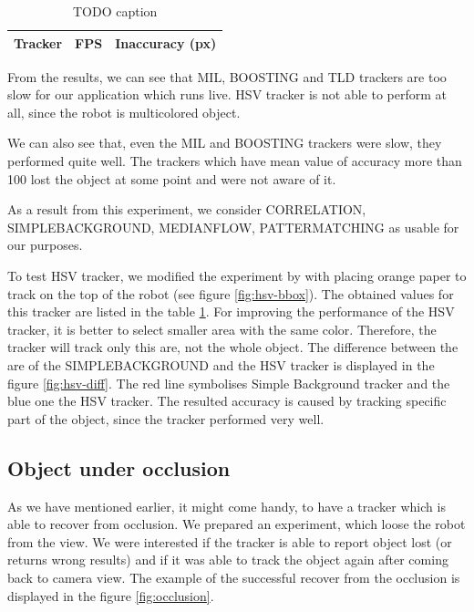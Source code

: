 \begin{table}
\centering
\begin{tabular}{l|l|l}
Tracker	& FPS & Inaccuracy (px) \\
\hline

\end{tabular}
\caption{TODO caption}
\label{table:hsv}
\end{table}

From the results, we can see that MIL, BOOSTING and TLD trackers are too slow
for our application which runs live. HSV tracker is not able to perform at
all, since the robot is multicolored object.

We can also see that, even the MIL and BOOSTING trackers were slow, they
performed quite well. The trackers which have mean value of accuracy more than
100 lost the object at some point and were not aware of it.

As a result from this experiment, we consider CORRELATION, SIMPLEBACKGROUND,
MEDIANFLOW, PATTERMATCHING as usable for our purposes.

To test HSV tracker, we modified the experiment by with placing orange paper to
track on the top of the robot (see figure \ref{fig:hsv-bbox}). The obtained
values for this tracker are listed in the table \ref{table:hsv}. For improving
the performance of the HSV tracker, it is better to select smaller area with
the same color. Therefore, the tracker will track only this are, not the whole
object. The difference between the are of the SIMPLEBACKGROUND and the HSV
tracker is displayed in the figure \ref{fig:hsv-diff}. The red line symbolises
Simple Background tracker and the blue one the HSV tracker. The resulted
accuracy is caused by tracking specific part of the object, since the tracker
performed very well.


\subsection{Object under occlusion}

As we have mentioned earlier, it might come handy, to have a tracker which is
able to recover from occlusion. We prepared an experiment, which loose the
robot from the view. We were interested if the tracker is able to report object
lost (or returns wrong results) and if it was able to track the object again
after coming back to camera view. The example of the successful recover from
the occlusion is displayed in the figure \ref{fig:occlusion}.


